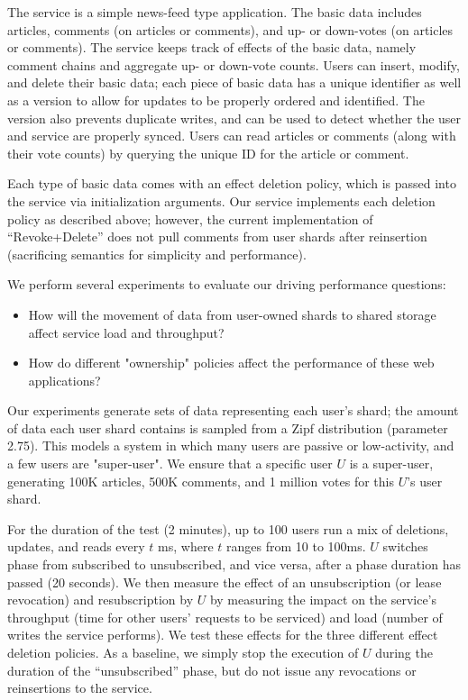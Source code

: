 \documentclass[letterpaper,twocolumn,10pt]{article}
\begin{document}
The service is a simple news-feed type application. The basic data includes articles, comments (on articles or comments), and up- or down-votes (on articles or comments). The service keeps track of effects of the basic data, namely comment chains and aggregate up- or down-vote counts. Users can insert, modify, and delete their basic data; each piece of basic data has a unique identifier as well as a version to allow for updates to be properly ordered and identified.
The version also prevents duplicate writes, and can be used to detect whether the user and service are properly synced.
Users can read articles or comments (along with their vote counts) by querying the unique ID for the article or comment.

Each type of basic data comes with an effect deletion policy, which is passed into the service via initialization arguments. Our service implements each deletion policy as described above; however, the current implementation of ``Revoke+Delete'' does not pull comments from user shards after reinsertion (sacrificing semantics for simplicity and performance).

We perform several experiments to evaluate our driving performance questions:
\begin{itemize}
    \item How will the movement of data from user-owned shards to shared storage affect service load and throughput?
    \item How do different "ownership" policies affect the performance of these web applications?
\end{itemize}
Our experiments generate sets of data representing each user's shard; the amount of data each user shard contains is sampled from a Zipf distribution (parameter 2.75). This models a system in which many users are passive or low-activity, and a few users are "super-user". 
We ensure that a specific user $U$ is a super-user, generating 100K articles, 500K comments, and 1 million votes for this $U$'s user shard.

For the duration of the test (2 minutes), up to 100 users run a mix of deletions, updates, and reads every $t$ ms, where $t$ ranges from 10 to 100ms. $U$ switches phase from subscribed to unsubscribed, and vice versa, after a phase duration has passed (20 seconds).
We then measure the effect of an unsubscription (or lease revocation) and resubscription by $U$ by measuring the impact on the service's throughput (time for other users' requests to be serviced) and load (number of writes the service performs). We test these effects for the three different effect deletion policies.
As a baseline, we simply stop the execution of $U$ during the duration of the ``unsubscribed'' phase, but do not issue any revocations or reinsertions to the service.
\end{document}

